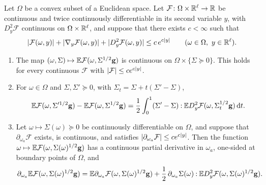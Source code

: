 \begin{lemma}\label{lem:flow-gauss}
Let $\Omega$ be a convex subset of a Euclidean space. Let $\mathcal F\colon\Omega\times\mathbb R^\ell\to\mathbb R$ be
continuous and twice continuously differentiable in its second variable $y$,
with $D^2_y\mathcal F$ continuous on $\Omega\times\mathbb R^\ell$, and suppose that there exists
$c<\infty$ such that
\begin{equation}\label{eq:flow-growth}
 \lvert \mathcal F(\omega,y)\rvert+\lvert \nabla_y\mathcal F(\omega,y)\rvert+\lvert D^2_y\mathcal F(\omega,y)\rvert
 \le c\,e^{c\lvert y\rvert}\qquad(\omega\in\Omega,\ y\in\mathbb R^\ell).
\end{equation}
\begin{enumerate}[label=\textup{(\alph*)}]
\item The map $(\omega,\Sigma)\mapsto\mathbb E\mathcal F(\omega,\Sigma^{1/2}\mathbf g)$ is continuous
 on $\Omega\times\{\Sigma\succeq0\}$. This holds for every continuous $\mathcal F$ with
 $\lvert \mathcal F\rvert\le ce^{c\lvert y\rvert}$.
\item For $\omega\in\Omega$ and $\Sigma,\Sigma'\succeq0$, with
 $\Sigma_t=\Sigma+t(\Sigma'-\Sigma)$,
 \[
  \mathbb E\mathcal F(\omega,\Sigma'^{1/2}\mathbf g)-\mathbb E\mathcal F(\omega,\Sigma^{1/2}\mathbf g)
  =\frac12\int_0^1(\Sigma'-\Sigma)\mathbin{:}
  \mathbb E D^2_y\mathcal F(\omega,\Sigma_t^{1/2}\mathbf g)\,\mathrm d t.
 \]
\item Let $\omega\mapsto\Sigma(\omega)\succeq0$ be continuously differentiable on
 $\Omega$, and suppose that $\partial_{\omega_a}\mathcal F$ exists, is continuous, and
 satisfies $\lvert \partial_{\omega_a}\mathcal F\rvert\le ce^{c\lvert y\rvert}$. Then the function
 $\omega\mapsto\mathbb E\mathcal F(\omega,\Sigma(\omega)^{1/2}\mathbf g)$ has a continuous partial
 derivative in $\omega_a$, one-sided at boundary points of $\Omega$, and
 \begin{equation}\label{eq:flow-gauss-derivative}
  \partial_{\omega_a}\mathbb E\mathcal F(\omega,\Sigma(\omega)^{1/2}\mathbf g)
  =\mathbb E\partial_{\omega_a}\mathcal F(\omega,\Sigma(\omega)^{1/2}\mathbf g)
  +\frac12\,\partial_{\omega_a}\Sigma(\omega)\mathbin{:}
  \mathbb E D^2_y\mathcal F(\omega,\Sigma(\omega)^{1/2}\mathbf g).
 \end{equation}
\end{enumerate}
\end{lemma}

